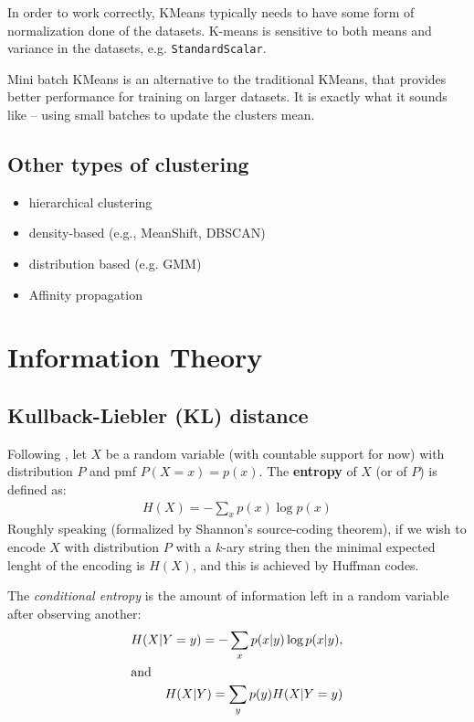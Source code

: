 \documentclass[12pt]{article}
\begin{document}
In order to work correctly, KMeans typically needs to have some form of
normalization done of the datasets. K-means is sensitive to both means and
variance in the datasets, e.g. {\tt StandardScalar}.


Mini batch KMeans is an alternative to the traditional KMeans, that provides
better performance for training on larger datasets. It is exactly what it sounds
like -- using small batches to update the clusters mean.

\subsection{Other types of clustering}

\begin{itemize}
\item hierarchical clustering
\item density-based (e.g., MeanShift, DBSCAN)
\item distribution based (e.g. GMM)
\item Affinity propagation
\end{itemize}


\pagebreak

\section{Information Theory}
\newrefsection

\subsection{Kullback-Liebler (KL) distance}


Following \cite[\S2.1]{Duchi_2016}, let $X$ be a random variable (with countable
support for now) with distribution $P$ and pmf $P(X=x)=p(x)$. The {\bf entropy} of $X$ (or of $P$) is
defined as:
\begin{align*}
  H(X) = -\sum_x p(x) \log p(x)
\end{align*}
Roughly speaking (formalized by Shannon's source-coding theorem), if we wish to
encode $X$ with distribution $P$ with a $k$-ary string then the minimal expected
lenght of the encoding is $H(X)$, and this is achieved by Huffman codes.

The {\sl conditional entropy} is the amount of information left in a random
variable after observing another:
\begin{align*}
  H(X | Y=y) = -\sum_x p(x|y) \log p(x|y),\\
  \intertext{and}
  H(X|Y) = \sum_y p(y) H(X|Y=y)
\end{align*}
\end{document}
